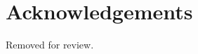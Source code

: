 \documentclass[10pt, a4paper]{article}
\begin{document}





\section*{Acknowledgements}

Removed for review.





\end{document}
